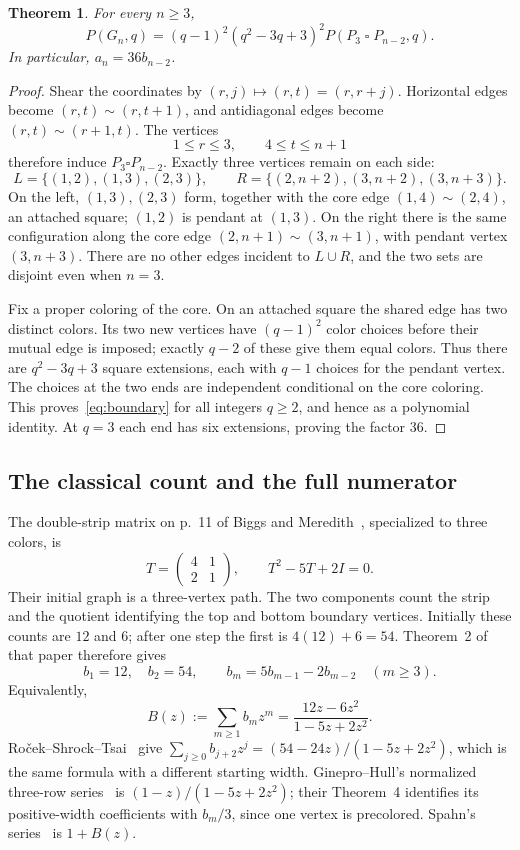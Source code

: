 \documentclass[11pt,a4paper]{article}
\newtheorem{theorem}{Theorem}
\begin{document}
\begin{theorem}\label{thm:boundary}
For every \(n\ge3\),
\begin{equation}\label{eq:boundary}
 P(G_n,q)=(q-1)^2(q^2-3q+3)^2
 P(P_3\mathbin{\square}P_{n-2},q).
\end{equation}
In particular, \(a_n=36b_{n-2}\).
\end{theorem}
\begin{proof}
Shear the coordinates by \((r,j)\mapsto(r,t)=(r,r+j)\).
Horizontal edges become \((r,t)\sim(r,t+1)\), and antidiagonal edges
become \((r,t)\sim(r+1,t)\). The vertices
\[
 1\le r\le3,\qquad4\le t\le n+1
\]
therefore induce \(P_3\square P_{n-2}\).
Exactly three vertices remain on each side:
\[
 L=\{(1,2),(1,3),(2,3)\},\qquad
 R=\{(2,n+2),(3,n+2),(3,n+3)\}.
\]
On the left, \((1,3),(2,3)\) form, together with the core edge
\((1,4)\sim(2,4)\), an attached square; \((1,2)\) is pendant at
\((1,3)\). On the right there is the same configuration along the core
edge \((2,n+1)\sim(3,n+1)\), with pendant vertex \((3,n+3)\).
There are no other edges incident to \(L\cup R\), and the two sets are
disjoint even when \(n=3\).

Fix a proper coloring of the core. On an attached square the shared
edge has two distinct colors. Its two new vertices have \((q-1)^2\)
color choices before their mutual edge is imposed; exactly \(q-2\)
of these give them equal colors. Thus there are
\(q^2-3q+3\) square extensions, each with \(q-1\) choices for the
pendant vertex. The choices at the two ends are independent conditional
on the core coloring. This proves~\eqref{eq:boundary} for all integers
\(q\ge2\), and hence as a polynomial identity. At \(q=3\) each end
has six extensions, proving the factor 36.
\end{proof}

\subsection*{The classical count and the full numerator}
The double-strip matrix on p.~11 of Biggs and Meredith~\cite{bm},
specialized to three colors, is
\[
 T=\begin{pmatrix}4&1\\2&1\end{pmatrix},\qquad
 T^2-5T+2I=0.
\]
Their initial graph is a three-vertex path. The two components count
the strip and the quotient identifying the top and bottom boundary
vertices. Initially these counts are \(12\) and \(6\); after one
step the first is \(4(12)+6=54\).
Theorem~2 of that paper therefore gives
\[
 b_1=12,\quad b_2=54,\qquad
 b_m=5b_{m-1}-2b_{m-2}\quad(m\ge3).
\]
Equivalently,
\begin{equation}\label{eq:grid-gf}
 B(z):=\sum_{m\ge1}b_mz^m=\frac{12z-6z^2}{1-5z+2z^2}.
\end{equation}
Ro\v{c}ek--Shrock--Tsai~\cite[eqs.~(2.35)--(2.36),
(2.40)--(2.41)]{rst} give
\(\sum_{j\ge0}b_{j+2}z^j=(54-24z)/(1-5z+2z^2)\),
which is the same formula with a different starting width.
Ginepro--Hull's normalized three-row series~\cite[p.~6]{gh} is
\((1-z)/(1-5z+2z^2)\); their Theorem~4 identifies its positive-width
coefficients with \(b_m/3\), since one vertex is precolored.
Spahn's series~\cite[pp.~44--45]{spahn} is \(1+B(z)\).
\end{document}
